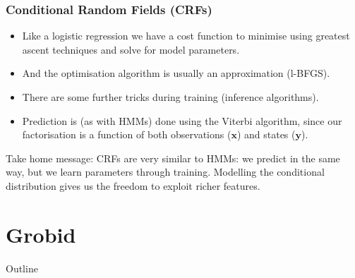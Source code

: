 \documentclass{beamer}
\begin{document}


\begin{frame}
\frametitle{Conditional Random Fields (CRFs)}
\begin{itemize}
\item Like a logistic regression we have a cost function to minimise using greatest ascent techniques and solve for model parameters.
\item And the optimisation algorithm is usually an approximation (l-BFGS).
\item There are some further tricks during training (inference algorithms).
\item Prediction is (as with HMMs) done using the Viterbi algorithm, since our factorisation is a function of both observations ($\mathbf{x}$) and states ($\mathbf{y}$).
\end{itemize}
Take home message: CRFs are very similar to HMMs: we predict in the same way, but we learn parameters through training. Modelling the conditional distribution gives us the freedom to exploit richer features.
\end{frame}


\section{Grobid}
\begin{frame}[noframenumbering]{Outline}
\tableofcontents[currentsection]
\end{frame}

\end{document}
